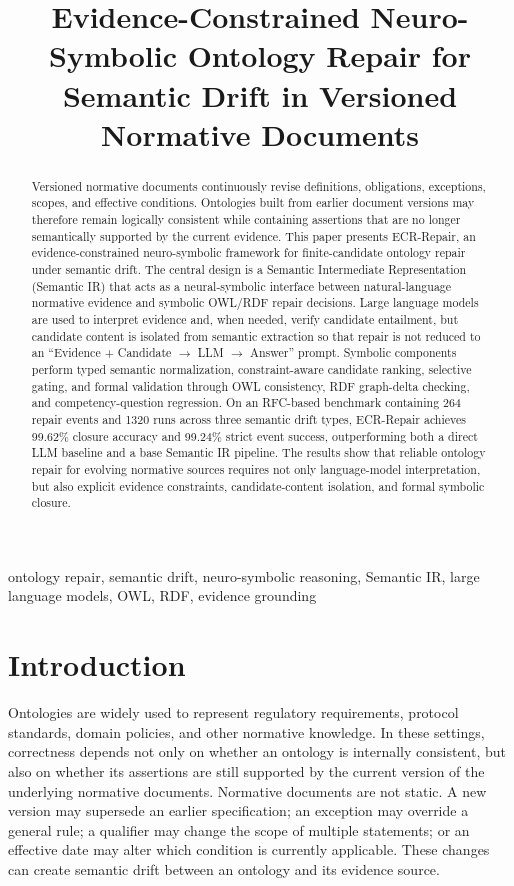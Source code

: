 \documentclass[conference]{IEEEtran}
\title{Evidence-Constrained Neuro-Symbolic Ontology Repair for Semantic Drift in Versioned Normative Documents}
\author{\IEEEauthorblockN{Anonymous Authors}
\IEEEauthorblockA{Anonymous Affiliation\\
Email: anonymous@example.com}}
\begin{document}
\maketitle

\begin{abstract}
Versioned normative documents continuously revise definitions, obligations, exceptions, scopes, and effective conditions. Ontologies built from earlier document versions may therefore remain logically consistent while containing assertions that are no longer semantically supported by the current evidence. This paper presents ECR-Repair, an evidence-constrained neuro-symbolic framework for finite-candidate ontology repair under semantic drift. The central design is a Semantic Intermediate Representation (Semantic IR) that acts as a neural-symbolic interface between natural-language normative evidence and symbolic OWL/RDF repair decisions. Large language models are used to interpret evidence and, when needed, verify candidate entailment, but candidate content is isolated from semantic extraction so that repair is not reduced to an ``Evidence + Candidate $\rightarrow$ LLM $\rightarrow$ Answer'' prompt. Symbolic components perform typed semantic normalization, constraint-aware candidate ranking, selective gating, and formal validation through OWL consistency, RDF graph-delta checking, and competency-question regression. On an RFC-based benchmark containing 264 repair events and 1320 runs across three semantic drift types, ECR-Repair achieves 99.62\% closure accuracy and 99.24\% strict event success, outperforming both a direct LLM baseline and a base Semantic IR pipeline. The results show that reliable ontology repair for evolving normative sources requires not only language-model interpretation, but also explicit evidence constraints, candidate-content isolation, and formal symbolic closure.
\end{abstract}

\begin{IEEEkeywords}
ontology repair, semantic drift, neuro-symbolic reasoning, Semantic IR, large language models, OWL, RDF, evidence grounding
\end{IEEEkeywords}

\section{Introduction}

Ontologies are widely used to represent regulatory requirements, protocol standards, domain policies, and other normative knowledge. In these settings, correctness depends not only on whether an ontology is internally consistent, but also on whether its assertions are still supported by the current version of the underlying normative documents. Normative documents are not static. A new version may supersede an earlier specification; an exception may override a general rule; a qualifier may change the scope of multiple statements; or an effective date may alter which condition is currently applicable. These changes can create semantic drift between an ontology and its evidence source.
\end{document}
